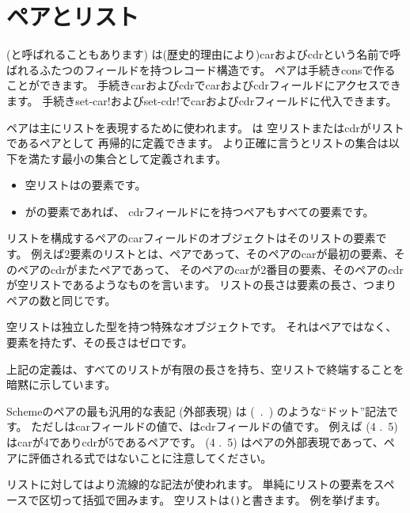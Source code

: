 \section{ペアとリスト}
\label{listsection}

 (と呼ばれることもあります)
は(歴史的理由により)carおよびcdrという名前で呼ばれるふたつのフィールドを持つレコード構造です。
ペアは手続き{\cf cons}で作ることができます。
手続き{\cf car}および{\cf cdr}でcarおよびcdrフィールドにアクセスできます。
手続き{\cf set-car!}および{\cf set-cdr!}でcarおよびcdrフィールドに代入できます。

ペアは主にリストを表現するために使われます。
は
空リストまたはcdrがリストであるペアとして
再帰的に定義できます。
より正確に言うとリストの集合は以下を満たす最小の集合として定義されます。

\begin{itemize}
\item 空リストはの要素です。
\item {}がの要素であれば、
      cdrフィールドにを持つペアもすべての要素です。
\end{itemize}

リストを構成するペアのcarフィールドのオブジェクトはそのリストの要素です。
例えば2要素のリストとは、ペアであって、そのペアのcarが最初の要素、そのペアのcdrがまたペアであって、
そのペアのcarが2番目の要素、そのペアのcdrが空リストであるようなものを言います。
リストの長さは要素の長さ、つまりペアの数と同じです。

空リストは独立した型を持つ特殊なオブジェクトです。
それはペアではなく、要素を持たず、その長さはゼロです。

\begin{note}
上記の定義は、すべてのリストが有限の長さを持ち、空リストで終端することを暗黙に示しています。
\end{note}

Schemeのペアの最も汎用的な表記 (外部表現) は
\hbox{\cf ( .\ )}
のような``ドット''記法です。
ただしはcarフィールドの値で、はcdrフィールドの値です。
例えば {\cf (4 .\ 5)} はcarが4でありcdrが5であるペアです。
{\cf (4 .\ 5)} はペアの外部表現であって、ペアに評価される式ではないことに注意してください。

リストに対してはより流線的な記法が使われます。
単純にリストの要素をスペースで区切って括弧で囲みます。
空リストは{\tt()}と書きます。
例を挙げます。

